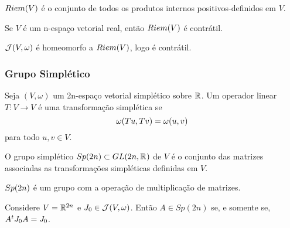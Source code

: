 \documentclass{beamer}
\begin{document}
	\begin{frame}
		
		\begin{definicao}
			$Riem(V)$ é o conjunto de todos os produtos internos positivos-definidos em $V$.
		\end{definicao}
		
		
		\begin{proposicao}
			Se $V$ é um n-espaço vetorial real, então $Riem(V)$ é contrátil.
		\end{proposicao}
		
		\begin{proposicao}
			$\mathcal{J}(V, \omega)$ é homeomorfo a $Riem(V)$, logo é contrátil.
		\end{proposicao}
	\end{frame}
	
	\begin{frame}
		\frametitle{Grupo Simplético}
		
		\begin{definicao}
			Seja $(V, \omega)$ um 2n-espaço vetorial simplético sobre $\mathbb{R}^{}$. Um operador linear $T: V \to V$ é uma transformação simplética se 
			$$
			\omega(Tu, Tv) = \omega(u, v)
			$$ para todo $u,v\in V$.
		\end{definicao}
		
		\begin{definicao}
			O grupo simplético $Sp(2n) \subset GL(2n, \mathbb{R}^{})$ de $V$ é o conjunto das matrizes associadas as transformações simpléticas definidas em $V$.
		\end{definicao}	
		
	\end{frame}
	
	\begin{frame}
		\begin{proposicao}
			$Sp(2n)$ é um grupo com a operação de multiplicação de matrizes.
		\end{proposicao}
		
		\begin{lema}[Caracterização de $Sp(2n)$]
			 Considere $V = \mathbb{R}^{2n}$ e $J_{0} \in \mathcal{J}(V, \omega)$. Então $A\in Sp(2n)$ se, e somente se, $A^{t}J_{0} A = J_{0}$.
		\end{lema}
	\end{frame}
	
\end{document}
